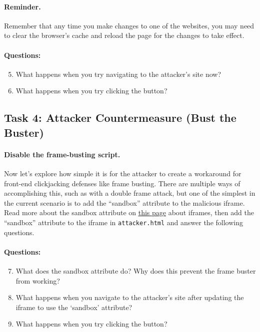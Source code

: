 \paragraph{Reminder.} Remember that any time you make changes to one of
the websites, you may need to clear the browser's cache and reload the
page for the changes to take effect.

\paragraph{Questions:}
\begin{enumerate}
\setcounter{enumi}{4}
    \item What happens when you try navigating to the attacker's site
          now?

    \item What happens when you try clicking the button?
\end{enumerate}



\subsection{Task 4: Attacker Countermeasure (Bust the Buster)}

\paragraph{Disable the frame-busting script.}
Now let's explore how simple it is for the attacker to create a
workaround for front-end clickjacking defenses like frame busting. There
are multiple ways of accomplishing this, such as with a double frame
attack, but one of the simplest in the current scenario is to add the
``sandbox'' attribute to the malicious iframe. Read more about the
sandbox attribute on
\underline{\href{https://developer.mozilla.org/en-US/docs/Web/HTML/Element/iframe}{this
page}} about iframes, then add the ``sandbox'' attribute to the iframe
in \texttt{attacker.html} and answer the following questions.  


\paragraph{Questions:}
\begin{enumerate}
\setcounter{enumi}{6}
    \item What does the sandbox attribute do? 
          Why does this prevent the frame buster from working?

    \item What happens when you navigate to the attacker's site after
          updating the iframe to use the `sandbox' attribute?

    \item What happens when you try clicking the button?
\end{enumerate}


